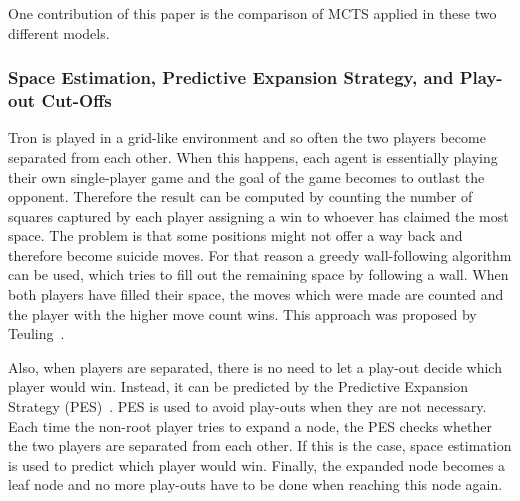 \documentclass{article}
\begin{document}
One contribution of this paper is the comparison of MCTS applied in these two different models. 


\subsubsection*{Space Estimation, Predictive Expansion Strategy, and Play-out Cut-Offs}

Tron is played in a grid-like environment and so often the two players become separated from each other. When this happens, each agent is essentially playing their own single-player game and the goal of the game becomes to outlast the opponent. Therefore the result can be computed by counting the number of squares captured by each player assigning a win to whoever has claimed the most space. The problem is that some positions might not offer a way back and therefore become suicide moves. For that reason a greedy wall-following algorithm can be used, which tries to fill out the remaining space by following a wall. When both players have filled their space, the moves which were made are counted and the player with the higher move count wins. This approach was proposed by Teuling~\cite{teuling_tron}. %

Also, when players are separated, there is no need to let a play-out decide which player would win. Instead, it can be predicted by the Predictive Expansion Strategy (PES)~\cite{teuling_tron}. PES is used to avoid play-outs when they are not necessary. Each time the non-root player tries to expand a node, the PES checks whether the two players are separated from each other. If this is the case, space estimation is used to predict which player would win. Finally, the expanded node becomes a leaf node and no more play-outs have to be done when reaching this node again. %
\end{document}
